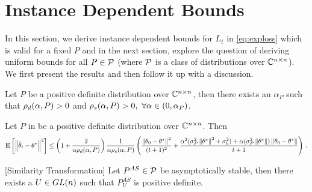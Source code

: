 \section{Instance Dependent Bounds}
In this section, we derive instance dependent bounds for $L_t$ in \eqref{eq:exploss} which is valid for a fixed $P$ and in the next section, explore the question of deriving uniform bounds for all $P\in \P$ (where $\P$ is a class of distributions over $\C^{\ncn}$). We first present the results and then follow it up with a discussion.
\begin{lemma}\label{lm:pd}
Let $P$ be a positive definite distribution over $\C^{\ncn}$, then there exists an $\alpha_P$ such that $\rhod{P}>0$ and $\rhos{P}>0,~\forall \alpha \in (0,\alpha_P)$.
\end{lemma}
\begin{theorem}\label{th:pdrate}
Let $P$ in  be a positive definite distribution over $\C^{\ncn}$. Then
\begin{align}
\EE{\norm{\thh_t-\theta^*}^2}
\leq
\left(1+\frac2{\alpha\rhod{P}}\right)\frac{1}{\alpha \rhos{P}}
\left(\frac{\norm{\theta_0-\theta^*}^2}{(t+1)^2}+ \frac{\alpha^2(\sigma_P^2\norm{\ts}^2+\sigma_b^2)+\alpha (\sigma_P^2\norm{\ts})\norm{\theta_0-\theta^*}}{t+1} \right)\,.
\end{align}

\end{theorem}

\begin{lemma}\label{lm:simtran}[Similarity Transformation]
Let $P^{AS}\in\P$ be asymptotically stable, then there exists a $U\in \gln$ such that $P^{AS}_U$ is positive definite.
\end{lemma}


